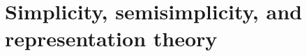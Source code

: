 \documentclass{amsart}[12pt]
\newcommand{\Z}{\mathbb{Z}}
\numberwithin{equation}{section}
\theoremstyle{plain} %
\newtheorem{lem}[equation]{Lemma}
\theoremstyle{definition}
\theoremstyle{remark}
\renewcommand{\sec}[1]{\section{#1}}
\begin{document}
\begin{comment}
	Let's say that $u = a_1 \otimes n_1 + \cdots + a_t \otimes n_t$. Consider the tensor product $B \otimes_R N$ as a quotient of the free abelian group with generating set consisting of elements of $B \times N$ by the submodule $Y$ with all the necessary relations we need to impose. This gives us a short exact sequence
	$$\xymatrix{0 \ar[r] & Y \ar[r] & F \ar[r]^-\pi & B \otimes_R N \ar[r] & 0.}$$
	The fact that $i(a_1) \otimes  n_1 + \cdots + i(a_t) \otimes n_t= 0$ means we can rewrite this element as $\pi(y)$ for some $y \in Y$. This element $y$ is a $\Z$-linear combination of elements of finitely many $(b,n) \in B \times N$. Let $m_1, \ldots, m_s$ be all the $N$-coordinates of those elements.

	Now we take $M$ to be the finitely generated submodule of $N$ generated by $n_1, \ldots, n_t$ and $m_1, \ldots, m_s$, and $v = a_1 \otimes n_1 + \cdots + a_t \otimes n_t \in A \otimes_R M$. Now
	$$(1_A \otimes j)(a_1 \otimes n_1 + \cdots + a_t \otimes n_t) = a_1 \otimes n_1 + \cdots + a_t \otimes n_t \in A \otimes_R N,$$
	and
	$$(i \otimes 1_M)(a_1 \otimes n_1 + \cdots + a_t \otimes n_t) = i(a_1) \otimes n_1 + \cdots + i(a_t) \otimes n_t = 0,$$ 
	as desired.
\end{proof}





The converse does over a PID.

\begin{lem}\label{pid flat iff torsion free}
	If $R$ is a principal ideal domain, an $R$-module $M$ is flat if and only if it is torsion free.
\end{lem}

\begin{proof}
	Suppose $M$ is a torsion free finitely generated $R$-module. The structure theorem for PIDs says that $M$ must be isomorphic to a direct sum of copies of cyclic modules. The cyclic module $R/I$ has torsion (all the elements are killed by $I$) unless $I = 0$. Therefore, $M$ must be isomorphic to a direct sum of copies of $R$, and thus free. Thus, $M$ is flat.
	
	Now let $M$ be any torsion free $R$-module. All of the finitely generated submodules of $R$ are also torsion free, and thus flat.
\end{proof}


\end{comment}


\sec{Simplicity, semisimplicity, and representation theory}
\end{document}
